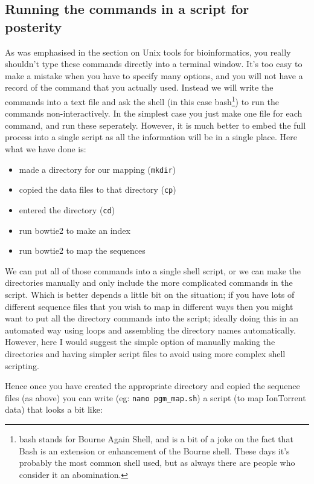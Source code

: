 \documentclass[11pt]{article}
\begin{document}
\subsection{Running the commands in a script for posterity}
\label{sec:orgheadline2}
As was emphasised in the section on Unix tools for bioinformatics, you really
shouldn't type these commands directly into a terminal window. It's too easy
to make a mistake when you have to specify many options, and you will not
have a record of the command that you actually used. Instead we will write
the commands into a text file and ask the shell (in this case
bash\footnote{bash stands for Bourne Again Shell, and is a bit of a joke on the
fact that Bash is an extension or enhancement of the Bourne shell. These days
it's probably the most common shell used, but as always there are people who
consider it an abomination.}) to run the commands non-interactively. In the simplest case
you just make one file for each command, and run these seperately. However,
it is much better to embed the full process into a single script as all the
information will be in a single place. Here what we have done is:

\begin{itemize}
\item made a directory for our mapping (\texttt{mkdir})
\item copied the data files to that directory (\texttt{cp})
\item entered the directory (\texttt{cd})
\item run bowtie2 to make an index
\item run bowtie2 to map the sequences
\end{itemize}

We can put all of those commands into a single shell script, or we can make
the directories manually and only include the more complicated commands in
the script. Which is better depends a little bit on the situation; if you
have lots of different sequence files that you wish to map in different ways
then you might want to put all the directory commands into the script;
ideally doing this in an automated way using loops and
assembling the directory names automatically. However, here I would suggest
the simple option of manually making the directories and having simpler
script files to avoid using more complex shell scripting.

Hence once you have created the appropriate directory and copied the sequence
files (as above) you can write (eg: \texttt{nano pgm\_map.sh}) a script (to map
IonTorrent data) that looks a bit like:
\end{document}
